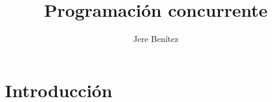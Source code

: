 \documentclass{report}
\title{Programación concurrente}
\author{Jere Benítez}
\begin{document}
\pagestyle{headings}
\maketitle
\newpage
\tableofcontents

\chapter{Introducción}

\end{document}
